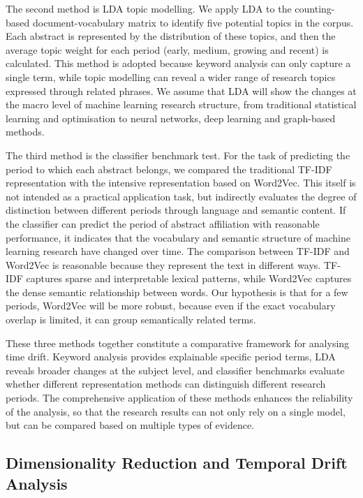 \documentclass[11pt]{article}
\begin{document}
The second method is LDA topic modelling. We apply LDA to the counting-based document-vocabulary matrix to identify five potential topics in the corpus. Each abstract is represented by the distribution of these topics, and then the average topic weight for each period (early, medium, growing and recent) is calculated. This method is adopted because keyword analysis can only capture a single term, while topic modelling can reveal a wider range of research topics expressed through related phrases. We assume that LDA will show the changes at the macro level of machine learning research structure, from traditional statistical learning and optimisation to neural networks, deep learning and graph-based methods.

The third method is the classifier benchmark test. For the task of predicting the period to which each abstract belongs, we compared the traditional TF-IDF representation with the intensive representation based on Word2Vec. This itself is not intended as a practical application task, but indirectly evaluates the degree of distinction between different periods through language and semantic content. If the classifier can predict the period of abstract affiliation with reasonable performance, it indicates that the vocabulary and semantic structure of machine learning research have changed over time. The comparison between TF-IDF and Word2Vec is reasonable because they represent the text in different ways. TF-IDF captures sparse and interpretable lexical patterns, while Word2Vec captures the dense semantic relationship between words. Our hypothesis is that for a few periods, Word2Vec will be more robust, because even if the exact vocabulary overlap is limited, it can group semantically related terms.

These three methods together constitute a comparative framework for analysing time drift. Keyword analysis provides explainable specific period terms, LDA reveals broader changes at the subject level, and classifier benchmarks evaluate whether different representation methods can distinguish different research periods. The comprehensive application of these methods enhances the reliability of the analysis, so that the research results can not only rely on a single model, but can be compared based on multiple types of evidence.

\subsection{Dimensionality Reduction and Temporal Drift Analysis}
\end{document}
